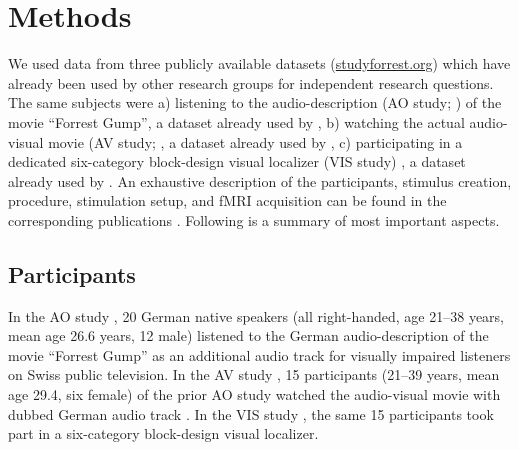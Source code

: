 \documentclass[english]{article}
\begin{document}
\section{Methods}


We used data from three publicly available datasets
(\href{http://www.studyforrest.org}{studyforrest.org}) which have already been
used by other research groups for independent research questions.
 The same
subjects were
a) listening to the audio-description (AO study; \citep{hanke2014audiomovie}) of
the movie ``Forrest Gump'', a dataset already used by \citep{hu2017decoding,
nguyen2016integration},
b) watching the actual audio-visual movie (AV study;
\citep{hanke2016simultaneous}, a dataset already used by
\citep{ben2018hippocampal},
c) participating in a dedicated six-category block-design visual localizer (VIS
study) \citep{sengupta2016extension}, a dataset already used by
\citep{jiahui2019predicting}.
An exhaustive description of the participants, stimulus creation, procedure,
stimulation setup, and fMRI acquisition can be found in the corresponding
publications \citep{hanke2014audiomovie, hanke2016simultaneous,
sengupta2016extension}. Following is a summary of most important aspects.


\subsection{Participants}
In the AO study \citep{hanke2014audiomovie}, 20 German native speakers (all
right-handed, age 21–38 years, mean age 26.6 years, 12 male) listened to the
German audio-description \citep{ForrestGumpGermanAD} of the movie ``Forrest
Gump'' \citep{ForrestGumpMovie} as an additional audio track for visually
impaired listeners on Swiss public television.
In the AV study \citep{hanke2016simultaneous}, 15 participants (21–39 years,
mean age 29.4, six female) of the prior AO study watched the audio-visual movie
with dubbed German audio track \citep{ForrestGumpDVD}.
In the VIS study \citep{sengupta2016extension}, the same 15 participants took
part in a six-category block-design visual localizer.
\end{document}

